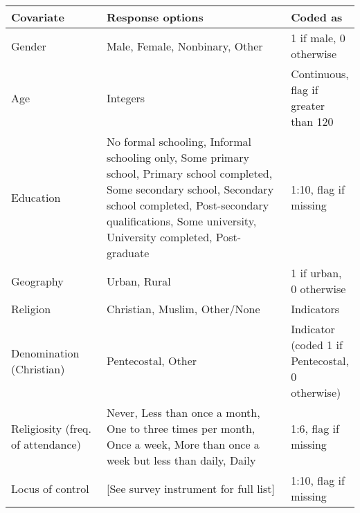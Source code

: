\begin{table}[H]
\begin{adjustbox}{totalheight=.9\baselineskip, max width = \textwidth}
\begin{tabular}{p{0.3\linewidth}p{0.7\linewidth}p{0.25\linewidth}}
\textbf{Covariate}                   & \textbf{Response options} & \textbf{Coded as}                                     \\
\hline
Gender                                      & Male,   Female, Nonbinary, Other                           & 1 if male, 0 otherwise  \\
Age                                         & Integers                                                   & Continuous, {flag if greater than 120}              \\
Education &
  No   formal schooling, Informal schooling only, Some primary school, Primary   school completed, Some secondary school, Secondary school completed,   Post-secondary qualifications, Some university, University completed,   Post-graduate &
  1:10, flag if missing \\
Geography                                   & Urban, Rural                                 & 1 if urban, 0 otherwise \\
Religion                                    & Christian, Muslim, Other/None                           & Indicators              \\
Denomination (Christian)  & Pentecostal, Other  & Indicator (coded 1 if Pentecostal, 0 otherwise)\\
Religiosity   (freq. of attendance) &
  Never,   Less than once a month, One to three times per month, Once a week, More than   once a week but less than daily, Daily &
  1:6, flag if missing \\
 Locus of control & 
[See survey instrument for full list] & 1:10, flag if missing\\

\end{tabular}
\end{adjustbox}
\end{table}
